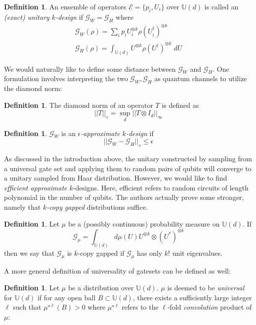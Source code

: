 \documentclass[12pt]{amsart}
\theoremstyle{definition}
\newtheorem{definition}[theorem]{Definition}
\theoremstyle{remark}
\numberwithin{equation}{section}
\theoremstyle{remark}
\begin{document}
\begin{definition}
  An ensemble of operators $\mathcal{E} = \{p_i, U_i\}$ over $\mathbb{U}(d)$ is called an \emph{(exact) unitary $k$-design} if $\mathcal{G}_W = \mathcal{G}_H$ where
  \begin{gather}
    \mathcal{G}_W(\rho) = \sum_{i} p_i U_i^{\otimes k}\rho (U_i^{\dagger})^{\otimes k} \\
    \mathcal{G}_H(\rho) = \int_{\mathbb{U}(d)} U^{\otimes k} \rho (U^\dagger)^{\otimes k} \; dU
  \end{gather}
\end{definition}
%
 We would naturally like to define some distance between $\mathcal{G}_W$ and $\mathcal{G}_H$. One formulation involves interpreting the two $\mathcal{G}_W, \mathcal{G}_H$ as quantum channels to utilize the diamond norm:
%
\begin{definition}
  The diamond norm of an operator $T$ is defined as
  $$||T||_{\diamond} = \sup_d ||T \otimes I_d ||_{\infty} $$
\end{definition}
%
\begin{definition}
  $\mathcal{G}_W$ is an \emph{$\epsilon$-approximate $k$-design} if
  \begin{equation}
    ||\mathcal{G}_W - \mathcal{G}_H ||_{\diamond}  \leq \epsilon
  \end{equation}
\end{definition}
%
As discussed in the introduction above, the unitary constructed by sampling from a universal gate set and applying them to random pairs of qubits will converge to a unitary sampled from Haar distribution. However, we would like to find \emph{efficient approximate} $k$-designs. Here, efficient refers to random circuits of length polynomial in the number of qubits. The authors actually prove some stronger, namely that \emph{$k$-copy gapped} distributions suffice.
%
\begin{definition}
  Let $\mu$ be a (possibly continuous) probability measure on $\mathbb{U}(d)$. If
  \begin{equation}
    \mathcal{G}_{\mu} = \int_{\mathbb{U}(d)} d\mu(U) U^{\otimes k} \otimes (U^*)^{\otimes k}
  \end{equation}
  then we say that $\mathcal{G}_\mu$ is $k$-copy gapped if $\mathcal{G}_\mu$ has only $k!$ unit eigenvalues.
\end{definition}
%
\noindent A more general definition of universality of gatesets can be defined as well:
%
\begin{definition}
  Let $\mu$ be a distribution over $\mathbb{U}(d)$. $\mu$ is deemed to be \emph{universal} for $\mathbb{U}(d)$ if for any open ball $B \subset \mathbb{U}(d)$, there exists a sufficiently large integer $\ell$ such that $\mu^{\star \ell}(B) > 0$
  where $\mu^{\star \ell}$ refers to the $\ell$-fold \emph{convolution} product of $\mu$:
\end{definition}
\end{document}
